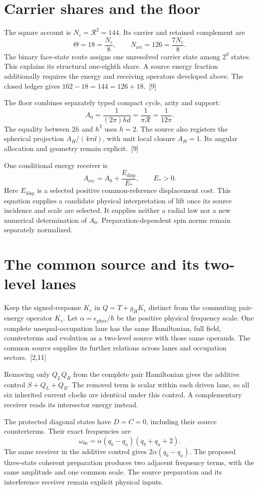 \documentclass[10pt,twocolumn,letterpaper]{article}
\begin{document}
\section{Carrier shares and the floor}
The square account is $N_c=\mathcal R^2=144$. Its carrier and retained complement are
\[
\Theta=18=\frac{N_c}{8},\qquad N_{\mathrm{ret}}=126=\frac{7N_c}{8}.
\]
The binary face-state route assigns one unresolved carrier state among $2^d$ states. This explains its structural one-eighth share. A source energy fraction additionally requires the energy and receiving operators developed above. The closed ledger gives $162-18=144=126+18$.~[9]

The floor combines separately typed compact cycle, arity and support:
\[
A_0=\frac{1}{(2\pi)hd}=\frac{1}{\pi\mathcal R}=\frac{1}{12\pi}.
\]
The equality between $2h$ and $h^2$ uses $h=2$. The source also registers the spherical projection $A_H/(4\pi d)$, with unit local closure $A_H=1$. Its angular allocation and geometry remain explicit.~[9]

One conditional energy receiver is
\[
A_{\mathrm{rec}}=A_0+\frac{E_{\mathrm{disp}}}{E_*},\qquad E_*>0.
\]
Here $E_{\mathrm{disp}}$ is a selected positive common-reference displacement cost. This equation supplies a candidate physical interpretation of lift once its source incidence and scale are selected. It supplies neither a radial law nor a new numerical determination of $A_0$. Preparation-dependent spin norms remain separately normalized.

\section{The common source and its two-level lanes}
Keep the signed-response $K_r$ in $Q=T+g_H K_r$ distinct from the commuting pair-energy operator $K_e$. Let $\alpha=\epsilon_{\mathrm{phys}}/\hbar$ be the positive physical frequency scale. One complete unequal-occupation lane has the same Hamiltonian, full field, counterterms and evolution as a two-level source with those same operands. The common source supplies its further relations across lanes and occupation sectors.~[2,11]

Removing only $Q_L Q_R$ from the complete pair Hamiltonian gives the additive control $S+Q_L+Q_R$. The removed term is scalar within each driven lane, so all six inherited current clocks are identical under this control. A complementary receiver reads its intersector energy instead.

The protected diagonal states have $D=C=0$, including their source counterterms. Their exact frequencies are
\[
\omega_{ba}=\alpha(q_b-q_a)(q_b+q_a+2).
\]
The same receiver in the additive control gives $2\alpha(q_b-q_a)$. The proposed three-state coherent preparation produces two adjacent frequency terms, with the same amplitude and one common scale. The source preparation and its interference receiver remain explicit physical inputs.
\end{document}
